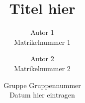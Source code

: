 \documentclass[ngerman]{scrartcl}
\newcommand{\authA}{Autor 1}
\newcommand{\matA}{Matrikelnummer 1}
\newcommand{\authB}{Autor 2}
\newcommand{\matB}{Matrikelnummer 2}
\newcommand{\grpnr}{Gruppennummer}
\newcommand{\datum}{Datum hier eintragen}
\begin{document}




\title{Titel hier}
\date{%
    \large Gruppe \grpnr \\[0.5cm]%
    \Large \datum
}
\author{
  \authA \\ \small \matA \and 
  \authB \\ \small \matB}
\maketitle





\tableofcontents

\pagestyle{scrheadings} %


\newpage



\newpage


\end{document}
